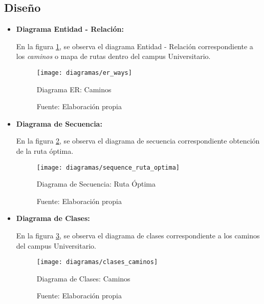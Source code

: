 
\subsection{Diseño}

\begin{itemize}
  \item \textbf{Diagrama Entidad - Relación:}

  En la figura \ref{fig:er_ways}, se observa el diagrama Entidad - Relación correspondiente a los \emph{caminos} o mapa de rutas dentro del campus Universitario.


\begin{figure}[H]
  \begin{center}
    \texttt{[image: diagramas/er\_ways]}
  \end{center}
  \caption{Diagrama ER: Caminos}
  \label{fig:er_ways}
  \caption*{Fuente: Elaboración propia}
\end{figure}



\item \textbf{Diagrama de Secuencia:}

En la figura \ref{fig:sequence_ruta_optima}, se observa el diagrama de secuencia correspondiente obtención de la ruta óptima.


\begin{figure}[H]
  \begin{center}
    \texttt{[image: diagramas/sequence\_ruta\_optima]}
  \end{center}
  \caption{Diagrama de Secuencia: Ruta Óptima}
  \label{fig:sequence_ruta_optima}
  \caption*{Fuente: Elaboración propia}
\end{figure}






\item \textbf{Diagrama de Clases:}

En la figura \ref{fig:clases_caminos}, se observa el diagrama de clases correspondiente a los caminos del campus Universitario.

\begin{figure}[H]
\begin{center}
  \texttt{[image: diagramas/clases\_caminos]}
\end{center}
\caption{Diagrama de Clases: Caminos}
\label{fig:clases_caminos}
\caption*{Fuente: Elaboración propia}
\end{figure}


\end{itemize}
